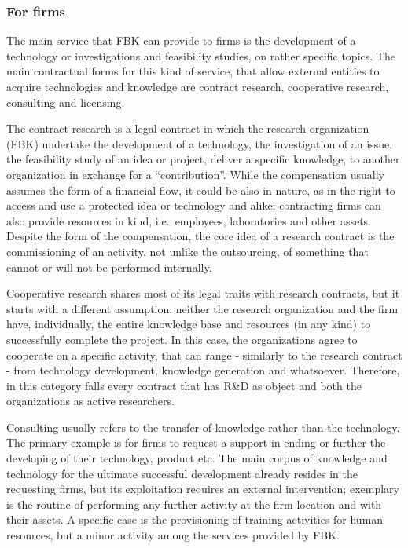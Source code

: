\subsubsection{For firms}

The main service that FBK can provide to firms is the development of a technology or investigations and feasibility studies, on rather specific topics. The main contractual forms for this kind of service, that allow external entities to acquire technologies and knowledge are contract research, cooperative research, consulting and licensing. 

The contract research is a legal contract in which the research organization (FBK) undertake the development of a technology, the investigation of an issue, the feasibility study of an idea or project, deliver a specific knowledge, to another organization in exchange for a \enquote{contribution}. While the compensation usually assumes the form of a financial flow, it could be also in nature, as in the right to access and use a protected idea or technology and alike; contracting firms can also provide resources in kind, i.e.\ employees, laboratories and other assets. Despite the form of the compensation, the core idea of a research contract is the commissioning of an activity, not unlike the outsourcing, of something that cannot or will not be performed internally.

Cooperative research shares most of its legal traits with research contracts, but it starts with a different assumption: neither the research organization and the firm have, individually, the entire knowledge base and resources (in any kind) to successfully complete the project. In this case, the organizations agree to cooperate on a specific activity, that can range - similarly to the research contract - from technology development, knowledge generation and whatsoever. Therefore, in this category falls every contract that has R\&D as object and both the organizations as active researchers.

Consulting usually refers to the transfer of knowledge rather than the technology. The primary example is for firms to request a support in ending or further the developing of their technology, product etc. The main corpus of knowledge and technology for the ultimate successful development already resides in the requesting firms, but its exploitation requires an external intervention; exemplary is the routine of performing any further activity at the firm location and with their assets. A specific case is the provisioning of training activities for human resources, but a minor activity among the services provided by FBK.


